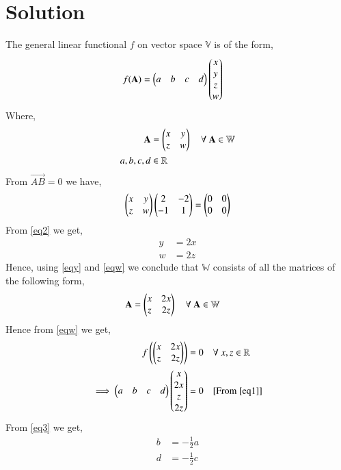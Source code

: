 \documentclass[journal,12pt,twocolumn]{IEEEtran}
\begin{document}
\section{\textbf{Solution}}
The general linear functional $f$ on vector space $\mathbb{V}$ is of the form,
\begin{align}
f(\mathbf{A}) &= \begin{pmatrix}a&b&c&d\end{pmatrix}\begin{pmatrix}x\\y\\z\\w\end{pmatrix}\label{eq1}
\end{align}
Where,
\begin{align}
\mathbf{A} &= \begin{pmatrix}x&y\\z&w\end{pmatrix} \quad{\text{$\forall$ $\mathbf{A} \in \mathbb{W}$}}\\
a,b,c,d &\in \mathbb{R}
\end{align}
From $\vec{AB} = 0$ we have,
\begin{align}
\begin{pmatrix}x&y\\z&w\end{pmatrix}\begin{pmatrix}2&-2\\-1&1\end{pmatrix} = \begin{pmatrix}0&0\\0&0\end{pmatrix}\label{eq2}
\end{align}
From \eqref{eq2} we get,
\begin{align}
y &= 2x\label{eqy}\\
w &= 2z\label{eqw}
\end{align}
Hence, using \eqref{eqy} and \eqref{eqw} we conclude that $\mathbb{W}$ consists of all the matrices of the following form,
\begin{align}
\mathbf{A} &= \begin{pmatrix}x&2x\\z&2z\end{pmatrix} \quad{\text{$\forall$ $\mathbf{A} \in \mathbb{W}$}}\label{eqw}
\end{align}
Hence from \eqref{eqw} we get,
\begin{align}
f\left(\begin{pmatrix}x&2x\\z&2z\end{pmatrix}\right) &= 0 \quad{\text{$\forall$ $x,z \in \mathbb{R}$}}\\
\implies \begin{pmatrix}a&b&c&d\end{pmatrix}\begin{pmatrix}x\\2x\\z\\2z\end{pmatrix} &= 0\quad{\text{[From \eqref{eq1}]}}\label{eq3}\\
\end{align}
From \eqref{eq3} we get,
\begin{align}
b &= -\frac{1}{2}a\label{eqb}\\
d &= -\frac{1}{2}c\label{eqd}
\end{align}
\end{document}
